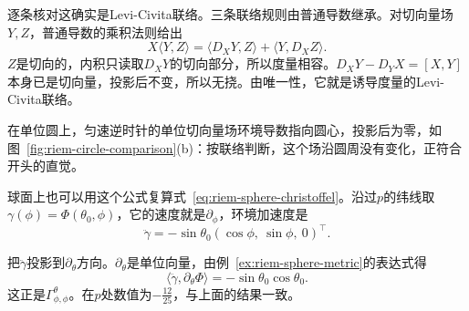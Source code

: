 逐条核对这确实是Levi-Civita联络。三条联络规则由普通导数继承。对切向量场$Y,Z$，普通导数的乘积法则给出
\[
X\langle Y,Z\rangle=\langle D_XY,Z\rangle+\langle Y,D_XZ\rangle .
\]
$Z$是切向的，内积只读取$D_XY$的切向部分，所以度量相容。$D_XY-D_YX=[X,Y]$本身已是切向量，投影后不变，所以无挠。由唯一性，它就是诱导度量的Levi-Civita联络。

在单位圆上，匀速逆时针的单位切向量场环境导数指向圆心，投影后为零，如图~\ref{fig:riem-circle-comparison}(b)：按联络判断，这个场沿圆周没有变化，正符合开头的直觉。

球面上也可以用这个公式复算式~\eqref{eq:riem-sphere-christoffel}。沿过$p$的纬线取$\gamma(\phi)=\Phi(\theta_0,\phi)$，它的速度就是$\partial_\phi$，环境加速度是
\[
\ddot\gamma=-\sin\theta_0(\cos\phi,\ \sin\phi,\ 0)^\top .
\]

把$\ddot\gamma$投影到$\partial_\theta$方向。$\partial_\theta$是单位向量，由例~\ref{ex:riem-sphere-metric}的表达式得
\[
\langle\ddot\gamma,\partial_\theta\Phi\rangle=-\sin\theta_0\cos\theta_0 .
\]
这正是$\Gamma^\theta_{\phi,\phi}$。在$p$处数值为$-\tfrac{12}{25}$，与上面的结果一致。
